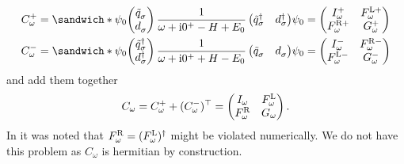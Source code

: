 \begin{subequations}
    \begin{align}
        C^+_\omega
         & =
        \sandwich*
        {\psi_0}
        {
            \begin{pmatrix}
                \tilde q^{\pdag}_\sigma \\
                d^{\pdag}_\sigma
            \end{pmatrix}
            \frac{1}{\omega + \mi0^+ - H + E_0}
            \begin{pmatrix}
                \tilde q^\dag_\sigma & d^\dag_\sigma
            \end{pmatrix}
        }
        {\psi_0}
        =
        \begin{pmatrix}
            I^+_\omega      & F^{\mL+}_\omega \\
            F^{\mR+}_\omega & G^+_\omega
        \end{pmatrix} \\
        C^-_\omega
         & =
        \sandwich*
        {\psi_0}
        {
            \begin{pmatrix}
                \tilde q^\dag_\sigma \\
                d^\dag_\sigma
            \end{pmatrix}
            \frac{1}{\omega + \mi0^+ + H - E_0}
            \begin{pmatrix}
                \tilde q^{\pdag}_\sigma & d^{\pdag}_\sigma
            \end{pmatrix}
        }
        {\psi_0}
        =
        \begin{pmatrix}
            I^-_\omega      & F^{\mR-}_\omega \\
            F^{\mL-}_\omega & G^-_\omega
        \end{pmatrix}
    \end{align}
\end{subequations}
and add them together
\begin{equation}
    C_\omega
    =
    C^+_\omega + (C^-_\omega)^\top
    =
    \begin{pmatrix}
        I_\omega       & F^{\mathrm{L}}_\omega \\
        F^{\mathrm{R}}_\omega & G_\omega
    \end{pmatrix}.
\end{equation}
In \cite{Kugler2022} it was noted that $F^{\mathrm{R}}_\omega = (F^{\mathrm{L}}_\omega)^\dag$
might be violated numerically.
We do not have this problem as $C_\omega$ is hermitian by construction.

